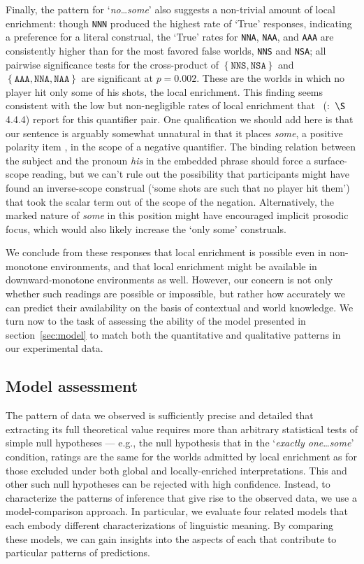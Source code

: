 \documentclass[leqno,12pt]{article}
\newcommand{\secref}[1]{section~\ref{#1}}
\newcommand{\seccitet}[2]{\citeauthor{#1}~(\citeyear{#1}:~$\S$#2)}
\newcommand{\word}[1]{\emph{#1}}
\newcommand{\set}[1]{\ensuremath{\left\{ #1 \right\}}}
\newcommand{\world}[1]{\texttt{#1}}
\newcommand{\target}[2]{`\word{#1}\ldots\word{#2}'}
\begin{document}
{Finally, the pattern for \target{no}{some} also suggests a non-trivial
amount of local enrichment: though \world{NNN} produced the highest
rate of `True' responses, indicating a preference for a literal
construal, the `True' rates for \world{NNA}, \world{NAA}, and
\world{AAA} are consistently higher than for the most favored false
worlds, \world{NNS} and \world{NSA}; all pairwise significance tests
for the cross-product of $\set{\world{NNS}, \world{NSA}}$ and
$\set{\world{AAA}, \world{NNA}, \world{NAA}}$ are significant at
$p = 0.002$. These are the worlds in which no player hit only some of
his shots, the local enrichment. This finding seems consistent with
the low but non-negligible rates of local enrichment that
\seccitet{Chemla:Spector:2011}{4.4.4} report for this quantifier
pair. One qualification we should add here is that our sentence is
arguably somewhat unnatural in that it places \word{some}, a positive
polarity item \citep{Baker70,Israel96}, in the scope of a negative
quantifier. The binding relation between the subject and the pronoun
\word{his} in the embedded phrase should force a surface-scope
reading, but we can't rule out the possibility that participants might
have found an inverse-scope construal (`some shots are such that no
player hit them') that took the scalar term out of the scope of the
negation. Alternatively, the marked nature of \word{some} in this
position might have encouraged implicit prosodic focus, which would
also likely increase the `only some' construals.

We conclude from these responses that local enrichment is possible
even in non-monotone environments, and that local enrichment might be
available in downward-monotone environments as well. However, our
concern is not only whether such readings are possible or impossible,
but rather how accurately we can predict their availability on the
basis of contextual and world knowledge.  We turn now to the task of
assessing the ability of the model presented in \secref{sec:model} to match both
the quantitative and qualitative patterns in our experimental data.



\subsection{Model assessment}\label{sec:binary:assess}

The pattern of data we observed is sufficiently precise and detailed
that extracting its full theoretical value requires more than
arbitrary statistical tests of simple null hypotheses --- e.g., the null
hypothesis that in the \target{exactly one}{some} condition, ratings
are the same for the worlds admitted by local enrichment as for those
excluded under both global and locally-enriched interpretations.  This
and other such null hypotheses can be rejected with high confidence.
Instead, to characterize the patterns of inference that give rise to
the observed data, we use a model-comparison approach. In particular,
we evaluate four related models that each embody different
characterizations of linguistic meaning. By comparing these models, we
can gain insights into the aspects of each that contribute to
particular patterns of predictions.

}
\end{document}
